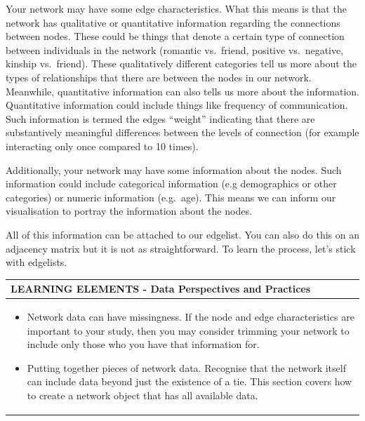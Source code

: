 \documentclass[
  letterpaper,
  DIV=11,
  numbers=noendperiod]{scrreprt}
\begin{document}
Your network may have some edge characteristics. What this means is that
the network has qualitative or quantitative information regarding the
connections between nodes. These could be things that denote a certain
type of connection between individuals in the network (romantic
vs.~friend, positive vs.~negative, kinship vs.~friend). These
qualitatively different categories tell us more about the types of
relationships that there are between the nodes in our network.
Meanwhile, quantitative information can also tells us more about the
information. Quantitative information could include things like
frequency of communication. Such information is termed the edges
``weight'' indicating that there are substantively meaningful
differences between the levels of connection (for example interacting
only once compared to 10 times).

Additionally, your network may have some information about the nodes.
Such information could include categorical information (e.g demographics
or other categories) or numeric information (e.g.~age). This means we
can inform our visualisation to portray the information about the nodes.

All of this information can be attached to our edgelist. You can also do
this on an adjacency matrix but it is not as straightforward. To learn
the process, let's stick with edgelists.

\begin{longtable}[]{@{}
  >{\raggedright\arraybackslash}p{}@{}}
\toprule\noalign{}
\begin{minipage}[b]{\linewidth}\raggedright
LEARNING ELEMENTS - Data Perspectives and Practices
\end{minipage} \\
\midrule\noalign{}
\endhead
\bottomrule\noalign{}
\endlastfoot
\begin{minipage}[t]{\linewidth}\raggedright
\begin{itemize}
\item
  Network data can have missingness. If the node and edge
  characteristics are important to your study, then you may consider
  trimming your network to include only those who you have that
  information for.
\item
  Putting together pieces of network data. Recognise that the network
  itself can include data beyond just the existence of a tie. This
  section covers how to create a network object that has all available
  data.
\end{itemize}
\end{minipage} \\
\end{longtable}
\end{document}
